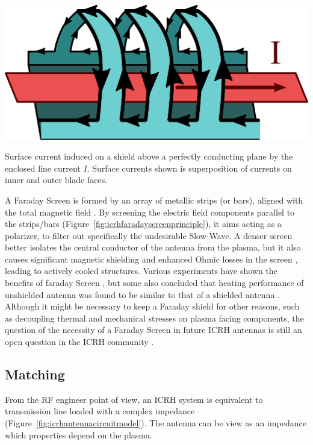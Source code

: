 \begin{marginfigure}[-0.5cm]
	\includegraphics[width=0.5\linewidth]{figures/chap3/WEST_ICRH/ICRH_Faraday_Screen_Principle}
	\caption{Surface current induced on a shield above a perfectly conducting plane by the enclosed line current $I$. Surface currents shown is superposition of currents on inner and outer blade faces.}
	\label{fig:icrhfaradayscreenprinciple}
\end{marginfigure}

A Faraday Screen is formed by an array of metallic strips (or bars), aligned with the total magnetic field . By screening the electric field components parallel to the strips/bars (Figure~\ref{fig:icrhfaradayscreenprinciple}), it aims acting as a polarizer, to filter out specifically the undesirable Slow-Wave. A denser screen better isolates the central conductor of the antenna from the plasma, but it also causes significant magnetic shielding and enhanced Ohmic losses in the screen , leading to actively cooled structures. Various experiments have shown the benefits of faraday Screen , but some also concluded that heating performance of unshielded antenna was found to be similar to that of a shielded antenna .  Although it might be necessary to keep a Faraday shield for other reasons, such as decoupling thermal and mechanical stresses on plasma facing components, the question of the necessity of a Faraday Screen in future ICRH antennas is still an open question in the ICRH community . 



\subsection{Matching}\label{sec:ICRH_matching_systems}
From the RF engineer point of view, an ICRH system is equivalent to transmission line loaded with a complex impedance (Figure~\ref{fig:icrhantennacircuitmodel}). The antenna can be view as an impedance which properties depend on the plasma. 

